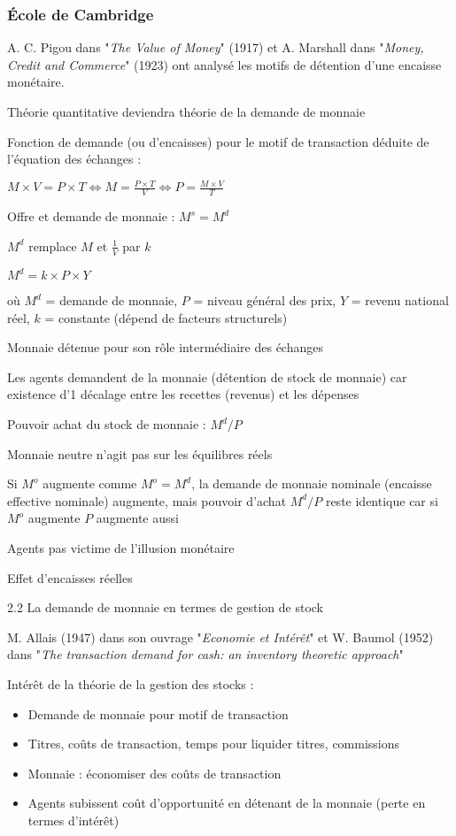 \documentclass[a4paper, 12pt]{report}
\begin{document}
\subsubsection{École de Cambridge}


A. C. Pigou dans "\textit{The Value of Money}" (1917) et A. Marshall dans "\textit{Money, Credit and Commerce}" (1923) ont analysé les motifs de détention d'une encaisse monétaire.
	
Théorie quantitative deviendra théorie de la demande de monnaie

Fonction de demande (ou d'encaisses) pour le motif de transaction déduite de l'équation des échanges :

$M \times V = P \times T \Leftrightarrow M = \frac{P \times T}{V} \Leftrightarrow P = \frac{M \times V}{T}$

Offre et demande de monnaie : $M^s = M^d$

$M^d$ remplace $M$ et $\frac{1}{V}$ par $k$

$M^d = k \times P \times Y$

où $M^d$ = demande de monnaie, $P$ = niveau général des prix, $Y$ = revenu national réel, $k$ = constante (dépend de facteurs structurels)

Monnaie détenue pour son rôle intermédiaire des échanges

Les agents demandent de la monnaie (détention de stock de monnaie) car existence d'1 décalage entre les recettes (revenus) et les dépenses

Pouvoir achat du stock de monnaie : $M^d/P$

Monnaie neutre n'agit pas sur les équilibres réels

Si $M^o$ augmente comme $M^o = M^d$, la demande de monnaie nominale (encaisse effective nominale) augmente, mais pouvoir d'achat $M^d / P$ reste identique car si $M^o$ augmente $P$ augmente aussi

Agents pas victime de l'illusion monétaire

Effet d'encaisses réelles

2.2 La demande de monnaie en termes de gestion de stock

M. Allais (1947) dans son ouvrage "\textit{Economie et Intérêt}" et W. Baumol (1952) dans "\textit{The transaction demand for cash: an inventory theoretic approach}"

Intérêt de la théorie de la gestion des stocks :
\begin{itemize}
	\item Demande de monnaie pour motif de transaction
	\item Titres, coûts de transaction, temps pour liquider titres, commissions
	\item Monnaie : économiser des coûts de transaction
	\item Agents subissent coût d'opportunité en détenant de la monnaie (perte en termes d'intérêt)
\end{itemize}
\end{document}
